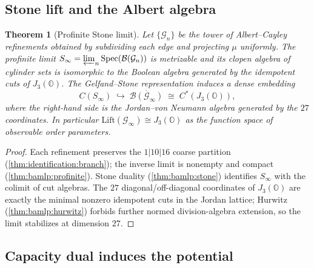 \documentclass[11pt]{article}
\theoremstyle{plain}
\newtheorem{theorem}{Theorem}[section]
\theoremstyle{definition}
\theoremstyle{remark}
\begin{document}
\subsection{Stone lift and the Albert algebra}
\label{sec:identification:stone}

\begin{theorem}[Profinite Stone limit]\label{thm:identification:stone}
Let $\{\mathcal{G}_n\}$ be the tower of Albert--Cayley refinements obtained by
subdividing each edge and projecting $\mu$ uniformly. The profinite limit
$S_\infty=\varprojlim_n\mathrm{Spec}(\mathcal{B}(\mathcal{G}_n))$ is metrizable
and its clopen algebra of cylinder sets is isomorphic to the Boolean algebra
generated by the idempotent cuts of $J_3(\mathbb{O})$. The Gelfand--Stone
representation induces a dense embedding
\begin{equation}
  C(S_\infty)\;\hookrightarrow\;\overline{\mathcal{B}(\mathcal{G}_\infty)}
  \;\cong\; C^*(J_3(\mathbb{O})),
\end{equation}
where the right-hand side is the Jordan--von Neumann algebra generated by the
$27$ coordinates. In particular $\mathrm{Lift}(\mathcal{G}_\infty)\cong
J_3(\mathbb{O})$ as the function space of observable order parameters.
\end{theorem}

\begin{proof}
Each refinement preserves the $1|10|16$ coarse partition
(\autoref{thm:identification:branch}); the inverse limit is nonempty and compact
(\autoref{thm:bamlp:profinite}). Stone duality
(\autoref{thm:bamlp:stone}) identifies $S_\infty$ with the colimit of cut
algebras. The $27$ diagonal/off-diagonal coordinates of $J_3(\mathbb{O})$ are
exactly the minimal nonzero idempotent cuts in the Jordan lattice; Hurwitz
(\autoref{thm:bamlp:hurwitz}) forbids further normed division-algebra extension,
so the limit stabilizes at dimension $27$.
\end{proof}

\subsection{Capacity dual induces the potential}
\label{sec:identification:potential}
\end{document}
